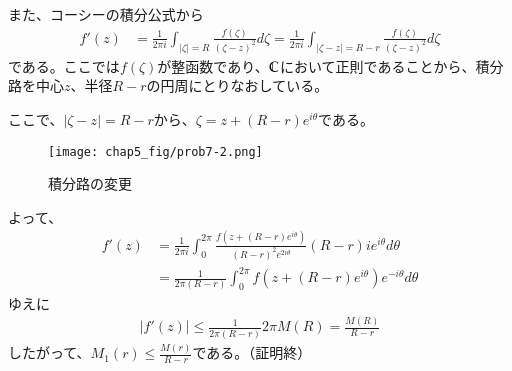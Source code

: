 また、コーシーの積分公式から
\begin{align*}
    f'(z)&=\frac{1}{2\pi i}\int_{|\zeta|=R}\frac{f(\zeta)}{(\zeta-z)^2}d\zeta
    =\frac{1}{2\pi i}\int_{|\zeta-z|=R-r}\frac{f(\zeta)}{(\zeta-z)^2}d\zeta
\end{align*}
である。ここでは$f(\zeta)$が整函数であり、$\mathbb{C}$において正則であることから、積分路を中心$z$、半径$R-r$の円周にとりなおしている。

ここで、$|\zeta-z|=R-r$から、$\zeta=z+(R-r)e^{i\theta}$である。

\begin{figure}[h]
    \centering
    \texttt{[image: chap5\_fig/prob7-2.png]}
    \caption{積分路の変更}
    \label{fig:chap5-7-2}
\end{figure}

よって、
\begin{align*}
    f'(z)&=\frac{1}{2\pi i}\int_{0}^{2\pi}
    \frac{f(z+(R-r)e^{i\theta})}{(R-r)^2e^{2i\theta}}(R-r)ie^{i\theta}d\theta\\
    &=\frac{1}{2\pi(R-r)}\int_{0}^{2\pi}
    f(z+(R-r)e^{i\theta})e^{-i\theta}d\theta
\end{align*}
ゆえに
\begin{align*}
    |f'(z)|\le\frac{1}{2\pi(R-r)}2\pi M(R)=\frac{M(R)}{R-r}
\end{align*}
したがって、$M_1(r)\le\frac{M(r)}{R-r}$である。（証明終）